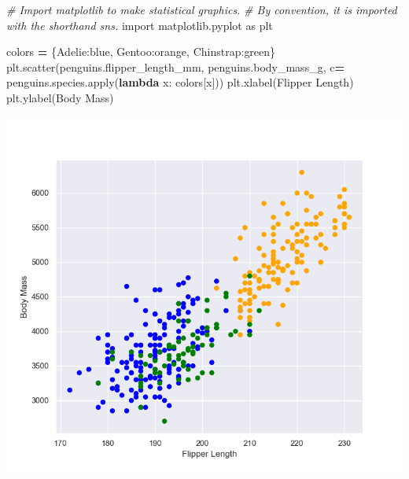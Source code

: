\documentclass[
]{book}
\newenvironment{Shaded}{\begin{snugshade}}{\end{snugshade}}
\newcommand{\BuiltInTok}[1]{#1}
\newcommand{\CommentTok}[1]{\textcolor[rgb]{0.56,0.35,0.01}{\textit{#1}}}
\newcommand{\ImportTok}[1]{#1}
\newcommand{\KeywordTok}[1]{\textcolor[rgb]{0.13,0.29,0.53}{\textbf{#1}}}
\newcommand{\NormalTok}[1]{#1}
\newcommand{\OperatorTok}[1]{\textcolor[rgb]{0.81,0.36,0.00}{\textbf{#1}}}
\newcommand{\StringTok}[1]{\textcolor[rgb]{0.31,0.60,0.02}{#1}}
\begin{document}
\begin{Shaded}
\begin{Highlighting}[]
\CommentTok{\# Import matplotlib to make statistical graphics. }
\CommentTok{\# By convention, it is imported with the shorthand sns.}
\ImportTok{import}\NormalTok{ matplotlib.pyplot }\ImportTok{as}\NormalTok{ plt}

\NormalTok{colors }\OperatorTok{=}\NormalTok{ \{}\StringTok{\textquotesingle{}Adelie\textquotesingle{}}\NormalTok{:}\StringTok{\textquotesingle{}blue\textquotesingle{}}\NormalTok{, }\StringTok{\textquotesingle{}Gentoo\textquotesingle{}}\NormalTok{:}\StringTok{\textquotesingle{}orange\textquotesingle{}}\NormalTok{, }\StringTok{\textquotesingle{}Chinstrap\textquotesingle{}}\NormalTok{:}\StringTok{\textquotesingle{}green\textquotesingle{}}\NormalTok{\}}
\NormalTok{plt.scatter(penguins.flipper\_length\_mm,}
\NormalTok{penguins.body\_mass\_g, }
\NormalTok{c}\OperatorTok{=}\NormalTok{ penguins.species.}\BuiltInTok{apply}\NormalTok{(}\KeywordTok{lambda}\NormalTok{ x: colors[x]))}
\NormalTok{plt.xlabel(}\StringTok{\textquotesingle{}Flipper Length\textquotesingle{}}\NormalTok{)}
\NormalTok{plt.ylabel(}\StringTok{\textquotesingle{}Body Mass\textquotesingle{}}\NormalTok{)}
\end{Highlighting}
\end{Shaded}

\begin{center}\includegraphics[width=0.9\linewidth]{fig/Viz_chap/1_matplot} \end{center}
\end{document}
